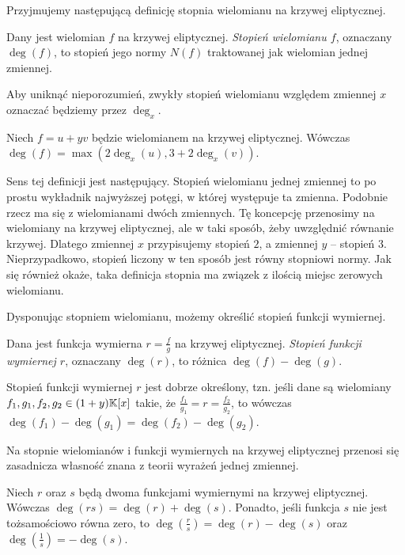 Przyjmujemy następującą definicję stopnia wielomianu na krzywej eliptycznej.

\begin{definition}
Dany jest wielomian $f$ na krzywej eliptycznej.
\emph{Stopień wielomianu $f$},
oznaczany $\deg(f)$,
to stopień jego normy $N(f)$ traktowanej jak wielomian jednej zmiennej.
\end{definition}

\begin{remark}
Aby uniknąć nieporozumień,
zwykły stopień wielomianu względem zmiennej $x$
oznaczać będziemy przez $\deg_x$.
\end{remark}

\begin{fact}
Niech $f = u + yv$ będzie wielomianem na krzywej eliptycznej.
Wówczas $\deg(f) = \max(2\deg_x(u), 3 + 2\deg_x(v))$.
\end{fact}

Sens tej definicji jest następujący. Stopień wielomianu jednej zmiennej
to po prostu wykładnik najwyższej potęgi, w której występuje ta zmienna.
Podobnie rzecz ma się z wielomianami dwóch zmiennych.
Tę koncepcję przenosimy na wielomiany na krzywej eliptycznej,
ale w taki sposób, żeby uwzględnić równanie krzywej.
Dlatego zmiennej $x$ przypisujemy stopień $2$,
a zmiennej $y$ -- stopień $3$.
Nieprzypadkowo, stopień liczony w ten sposób
jest równy stopniowi normy.
Jak się również okaże,
taka definicja stopnia ma związek z ilością miejsc zerowych wielomianu.

Dysponując stopniem wielomianu, możemy określić stopień funkcji wymiernej.

\begin{definition}
Dana jest funkcja wymierna $r = \frac{f}{g}$ na krzywej eliptycznej.
\emph{Stopień funkcji wymiernej $r$},
oznaczany $\deg(r)$,
to różnica $\deg(f) - \deg(g)$.
\end{definition}

\begin{theorem}
Stopień funkcji wymiernej $r$ jest dobrze określony,
tzn. jeśli dane są wielomiany $f_1, g_1, f_2, g_2 \in (1 + y)\mathbb{K}[x]$
takie, że $\frac{f_1}{g_1} = r = \frac{f_2}{g_2}$,
to wówczas $\deg(f_1) - \deg(g_1) = \deg(f_2) - \deg(g_2)$.
\end{theorem}

Na stopnie wielomianów i funkcji wymiernych na krzywej eliptycznej
przenosi się zasadnicza własność znana z teorii wyrażeń jednej zmiennej.

\begin{theorem}
Niech $r$ oraz $s$ będą dwoma funkcjami wymiernymi na krzywej eliptycznej.
Wówczas $\deg(rs) = \deg(r) + \deg(s)$.
Ponadto, jeśli funkcja $s$ nie jest tożsamościowo równa zero,
to $\deg(\frac{r}{s}) = \deg(r) - \deg(s)$ oraz $\deg(\frac{1}{s}) = -\deg(s)$.
\end{theorem}

